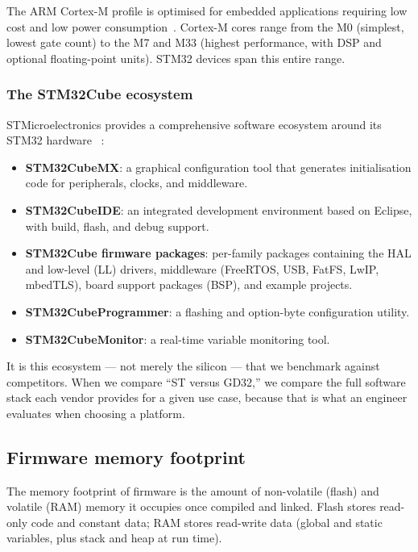 The ARM Cortex-M profile is optimised for embedded applications requiring low cost and low
power consumption~\cite{arm-cortexm}. Cortex-M cores range from the M0 (simplest, lowest
gate count) to the M7 and M33 (highest performance, with DSP and optional floating-point
units). STM32 devices span this entire range.

\subsubsection{The STM32Cube ecosystem}

STMicroelectronics provides a comprehensive software ecosystem around its STM32 hardware
~\cite{stm32cube-ecosystem}:

\begin{itemize}
\item \textbf{STM32CubeMX}: a graphical configuration tool that generates initialisation
code for peripherals, clocks, and middleware.
\item \textbf{STM32CubeIDE}: an integrated development environment based on Eclipse, with
build, flash, and debug support.
\item \textbf{STM32Cube firmware packages}: per-family packages containing the HAL and
low-level (LL) drivers, middleware (FreeRTOS, USB, FatFS, LwIP, mbedTLS), board support
packages (BSP), and example projects.
\item \textbf{STM32CubeProgrammer}: a flashing and option-byte configuration utility.
\item \textbf{STM32CubeMonitor}: a real-time variable monitoring tool.
\end{itemize}

It is this ecosystem --- not merely the silicon --- that we benchmark against competitors.
When we compare ``ST versus GD32,'' we compare the full software stack each vendor provides
for a given use case, because that is what an engineer evaluates when choosing a platform.

\subsection{Firmware memory footprint}
\label{sec:footprint-theory}

The memory footprint of firmware is the amount of non-volatile (flash) and volatile (RAM)
memory it occupies once compiled and linked. Flash stores read-only code and constant data;
RAM stores read-write data (global and static variables, plus stack and heap at run time).

